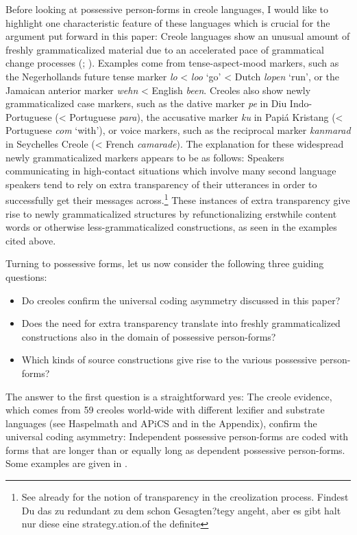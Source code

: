 \documentclass[output=paper]{langsci/langscibook}
\begin{document}
Before looking at possessive person-forms in creole languages, I would like to highlight one characteristic feature of these languages which is crucial for the argument put forward in this paper: Creole languages show an unusual amount of freshly grammaticalized material due to an accelerated pace of grammatical change processes (\citealt{HaspelmathMichaelis2017}; \citealt{MichaelisHaspelmath2018}). Examples come from tense-aspect-mood markers, such as the Negerhollands future tense marker \textit{lo} < \textit{loo} ‘go’ < Dutch \textit{lopen} ‘run’, or the Jamaican anterior marker \textit{wehn} < English \textit{been}. Creoles also show newly grammaticalized case markers, such as the dative marker \textit{pe} in Diu Indo-Portuguese (< Portuguese \textit{para}), the accusative marker \textit{ku} in Papiá Kristang (< Portuguese \textit{com} ‘with’), or voice markers, such as the reciprocal marker \textit{kanmarad} in Seychelles Creole (< French \textit{camarade}). The explanation for these widespread newly grammaticalized markers appears to be as follows: Speakers communicating in high-contact situations which involve many second language speakers tend to rely on extra transparency of their utterances in order to successfully get their messages across.\footnote{See already \citet{SeurenWekker1986} for the notion of transparency in the creolization process. Findest Du das zu redundant zu dem schon Gesagten?tegy angeht, aber es gibt halt nur diese eine strategy.ation.of the definite}  These instances of extra transparency give rise to newly grammaticalized structures by refunctionalizing erstwhile content words or otherwise less-grammaticalized constructions, as seen in the examples cited above.

Turning to possessive forms, let us now consider the following three guiding questions: 

\begin{itemize}
\item Do creoles confirm the universal coding asymmetry discussed in this paper?
\item Does the need for extra transparency translate into freshly grammaticalized constructions also in the domain of possessive person-forms?
\item Which kinds of source constructions give rise to the various possessive person-forms?
\end{itemize}

The answer to the first question is a straightforward yes: The creole evidence, which comes from 59 creoles world-wide with different lexifier and substrate languages (see Haspelmath and APiCS \citealt{Consortium2013} and  in the Appendix), confirm the universal coding asymmetry: Independent possessive person-forms are coded with forms that are longer than or equally long as dependent possessive person-forms. Some examples are given in . 
\end{document}
